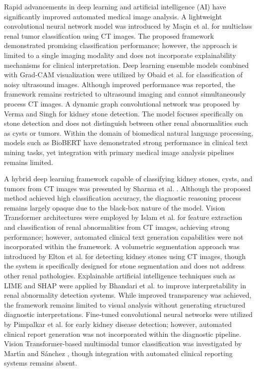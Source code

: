 \documentclass[preprint,12pt]{elsarticle}
\begin{document}
Rapid advancements in deep learning and artificial intelligence (AI) have significantly improved automated medical image analysis. A lightweight convolutional neural network model was introduced by Ma{\c{c}}in et al. \cite{macin2025kidneynext} for multiclass renal tumor classification using CT images. The proposed framework demonstrated promising classification performance; however, the approach is limited to a single imaging modality and does not incorporate explainability mechanisms for clinical interpretation. Deep learning ensemble models combined with Grad-CAM visualization were utilized by Obaid et al. \cite{obaid2025noisy} for classification of noisy ultrasound images. Although improved performance was reported, the framework remains restricted to ultrasound imaging and cannot simultaneously process CT images. A dynamic graph convolutional network was proposed by Verma and Singh \cite{verma2025automated} for kidney stone detection. The model focuses specifically on stone detection and does not distinguish between other renal abnormalities such as cysts or tumors. Within the domain of biomedical natural language processing, models such as BioBERT \cite{lee2020biobert} have demonstrated strong performance in clinical text mining tasks, yet integration with primary medical image analysis pipelines remains limited.

A hybrid deep learning framework capable of classifying kidney stones, cysts, and tumors from CT images was presented by Sharma et al. \cite{sharma2025hybrid}. Although the proposed method achieved high classification accuracy, the diagnostic reasoning process remains largely opaque due to the black-box nature of the model. Vision Transformer architectures were employed by Islam et al. \cite{islam2022vision} for feature extraction and classification of renal abnormalities from CT images, achieving strong performance; however, automated clinical text generation capabilities were not incorporated within the framework. A volumetric segmentation approach was introduced by Elton et al. \cite{elton2022deep} for detecting kidney stones using CT images, though the system is specifically designed for stone segmentation and does not address other renal pathologies. Explainable artificial intelligence techniques such as LIME and SHAP were applied by Bhandari et al. \cite{bhandari2023exploring} to improve interpretability in renal abnormality detection systems. While improved transparency was achieved, the framework remains limited to visual analysis without generating structured diagnostic interpretations. Fine-tuned convolutional neural networks were utilized by Pimpalkar et al. \cite{pimpalkar2025fine} for early kidney disease detection; however, automated clinical report generation was not incorporated within the diagnostic pipeline. Vision Transformer-based multimodal tumor classification was investigated by Mart{\'\i}n and S{\'a}nchez \cite{martin2025evaluation}, though integration with automated clinical reporting systems remains absent.
\end{document}

